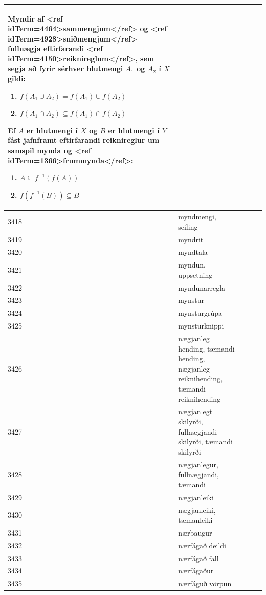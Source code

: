 \begin{longtable}{p{}|p{}|p{}|p{}|p{}}
Myndir af <ref idTerm=4464>sammengjum</ref> og <ref idTerm=4928>sniðmengjum</ref> fullnægja eftirfarandi <ref idTerm=4150>reiknireglum</ref>, sem segja að fyrir sérhver hlutmengi $A_1$ og $A_2$ í $X$ gildi:

\begin{enumerate}
    \item $f(A_1 \cup A_2) = f(A_1) \cup f(A_2)$
    \item $f(A_1 \cap A_2) \subseteq f(A_1) \cap f(A_2)$
\end{enumerate}

Ef $A$ er hlutmengi í $X$ og $B$ er hlutmengi í $Y$ fást jafnframt eftirfarandi reiknireglur um samspil mynda og <ref idTerm=1366>frummynda</ref>:

\begin{enumerate}
    \item $A \subseteq f^{-1}(f(A))$
    \item $f(f^{-1}(B)) \subseteq B$
\end{enumerate} & \\
\hline
3418 & myndmengi, seiling &  &  &  \\
\hline
3419 & myndrit &  &  &  \\
\hline
3420 & myndtala &  &  &  \\
\hline
3421 & myndun, uppsetning &  &  &  \\
\hline
3422 & myndunarregla &  &  &  \\
\hline
3423 & mynstur &  &  &  \\
\hline
3424 & mynsturgrúpa &  &  &  \\
\hline
3425 & mynsturknippi &  &  &  \\
\hline
3426 & nægjanleg hending, tæmandi hending, nægjanleg reiknihending, tæmandi reiknihending &  &  &  \\
\hline
3427 & nægjanlegt skilyrði, fullnægjandi skilyrði, tæmandi skilyrði &  &  &  \\
\hline
3428 & nægjanlegur, fullnægjandi, tæmandi &  &  &  \\
\hline
3429 & nægjanleiki &  &  &  \\
\hline
3430 & nægjanleiki, tæmanleiki &  &  &  \\
\hline
3431 & nærbaugur &  &  &  \\
\hline
3432 & nærfágað deildi &  &  &  \\
\hline
3433 & nærfágað fall &  &  &  \\
\hline
3434 & nærfágaður &  &  &  \\
\hline
3435 & nærfáguð vörpun &  &  &  \\

\end{longtable}
